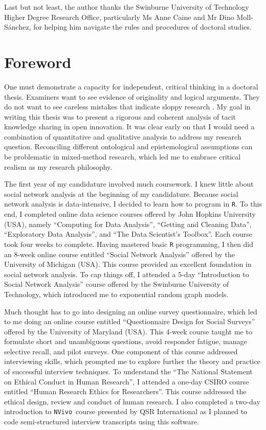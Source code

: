 \documentclass[12pt,table,xcdraw]{book}
\begin{document}
Last but not least, the author thanks the Swinburne University of Technology Higher Degree Research Office, particularly Ms Anne Caine and Mr Dino Moll-S\'anchez, for helping him navigate the rules and procedures of doctoral studies.

\chapter*{Foreword}

One must demonstrate a capacity for independent, critical thinking in a doctoral thesis. Examiners want to see evidence of originality and logical arguments. They do not want to see careless mistakes that indicate sloppy research \citep{mullins2002its}. My goal in writing this thesis was to present a rigorous and coherent analysis of tacit knowledge sharing in open innovation. It was clear early on that I would need a combination of quantitative and qualitative analysis to address my research question. Reconciling different ontological and epistemological assumptions can be problematic in mixed-method research, which led me to embrace critical realism as my research philosophy. \medskip

The first year of my candidature involved much coursework. I knew little about social network analysis at the beginning of my candidature. Because social network analysis is data-intensive, I decided to learn how to program in \texttt{R}. To this end, I completed online data science courses offered by John Hopkins University (USA), namely \enquote{Computing for Data Analysis}, \enquote{Getting and Cleaning Data}, \enquote{Exploratory Data Analysis}, and \enquote{The Data Scientist's Toolbox}. Each course took four weeks to complete. Having mastered basic \texttt{R} programming, I then did an 8-week online course entitled \enquote{Social Network Analysis} offered by the University of Michigan (USA). This course provided an excellent foundation in social network analysis. To cap things off, I attended a 5-day \enquote{Introduction to Social Network Analysis} course offered by the Swinburne University of Technology, which introduced me to exponential random graph models. \medskip

Much thought has to go into designing an online survey questionnaire, which led to me doing an online course entitled \enquote{Questionnaire Design for Social Surveys} offered by the University of Maryland (USA). This 4-week course taught me to formulate short and unambiguous questions, avoid responder fatigue, manage selective recall, and pilot surveys. One component of this course addressed interviewing skills, which prompted me to explore further the theory and practice of successful interview techniques. To understand the \enquote{The National Statement on Ethical Conduct in Human Research}, I attended a one-day CSIRO course entitled \enquote{Human Research Ethics for Researchers}. This course addressed the ethical design, review and conduct of human research. I also completed a two-day introduction to \texttt{NVivo}\texttrademark\ course presented by QSR International as I planned to code semi-structured interview transcripts using this software.  \medskip
\end{document}
